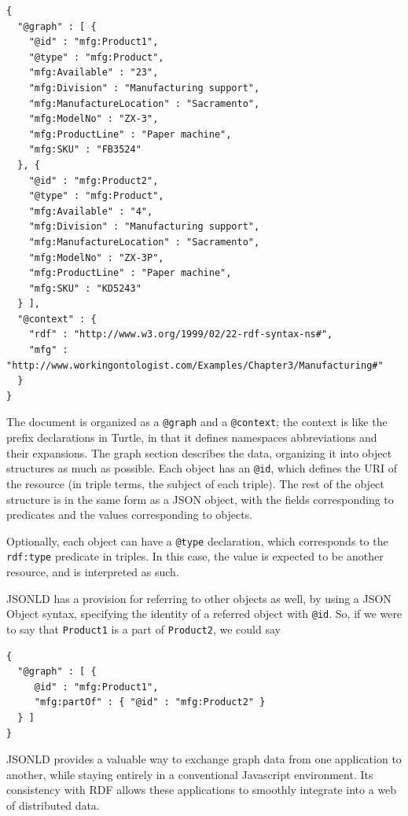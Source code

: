 \begin{lstlisting}
{
  "@graph" : [ {
    "@id" : "mfg:Product1",
    "@type" : "mfg:Product",
    "mfg:Available" : "23",
    "mfg:Division" : "Manufacturing support",
    "mfg:ManufactureLocation" : "Sacramento",
    "mfg:ModelNo" : "ZX-3",
    "mfg:ProductLine" : "Paper machine",
    "mfg:SKU" : "FB3524"
  }, {
    "@id" : "mfg:Product2",
    "@type" : "mfg:Product",
    "mfg:Available" : "4",
    "mfg:Division" : "Manufacturing support",
    "mfg:ManufactureLocation" : "Sacramento",
    "mfg:ModelNo" : "ZX-3P",
    "mfg:ProductLine" : "Paper machine",
    "mfg:SKU" : "KD5243"
  } ],
  "@context" : {
    "rdf" : "http://www.w3.org/1999/02/22-rdf-syntax-ns#",
    "mfg" : "http://www.workingontologist.com/Examples/Chapter3/Manufacturing#"
  }
}
\end{lstlisting}


The document is organized as a \texttt{@graph} and a \texttt{@context}; the context
is like the prefix declarations in Turtle, in that it defines namespaces
abbreviations and their expansions. The graph section describes the
data, organizing it into object structures as much as possible. Each
object has an \texttt{@id}, which defines the URI of the resource (in triple
terms, the subject of each triple). The rest of the object structure is
in the same form as a JSON object, with the fields corresponding to
predicates and the values corresponding to objects.

Optionally, each object can have a \texttt{@type} declaration, which corresponds
to the \texttt{rdf:type} predicate in triples. In this case, the value is
expected to be another resource, and is interpreted as such.

JSONLD has a provision for referring to other objects as well, by using
a JSON Object syntax, specifying the identity of a referred object with
\texttt{@id}. So, if we were to say that \texttt{Product1} is a part of \texttt{Product2}, we could
say

\begin{lstlisting}
{
  "@graph" : [ {
     @id" : "mfg:Product1",
     "mfg:partOf" : { "@id" : "mfg:Product2" }
  } ]
}    
\end{lstlisting}

JSONLD provides a valuable way to exchange graph data from one
application to another, while staying entirely in a conventional
Javascript environment. Its consistency with RDF allows these
applications to smoothly integrate into a web of distributed data.

